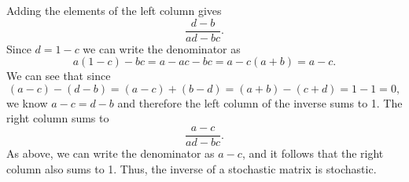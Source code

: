 \documentclass{amsart}
\begin{document}
	Adding the elements of the left column gives
	$$ \frac{d-b}{ad-bc} . $$
	Since $d=1-c$ we can write the denominator as $$a(1-c)-bc = a-ac-bc = a-c(a+b) = a-c .$$ 
	We can see that since $$(a-c) - (d-b) = (a-c) + (b-d) = (a+b) - (c+d) = 1-1 = 0,$$ 
	we know $a-c=d-b$ and therefore the left column of the inverse sums to 1. The right column sums to
	$$ \frac{a-c}{ad-bc} . $$
	As above, we can write the denominator as $a-c$, and it follows that the right column also sums to 1. Thus, the inverse of a stochastic matrix is stochastic.
	
	
	
	
	
	
	
\end{document}
